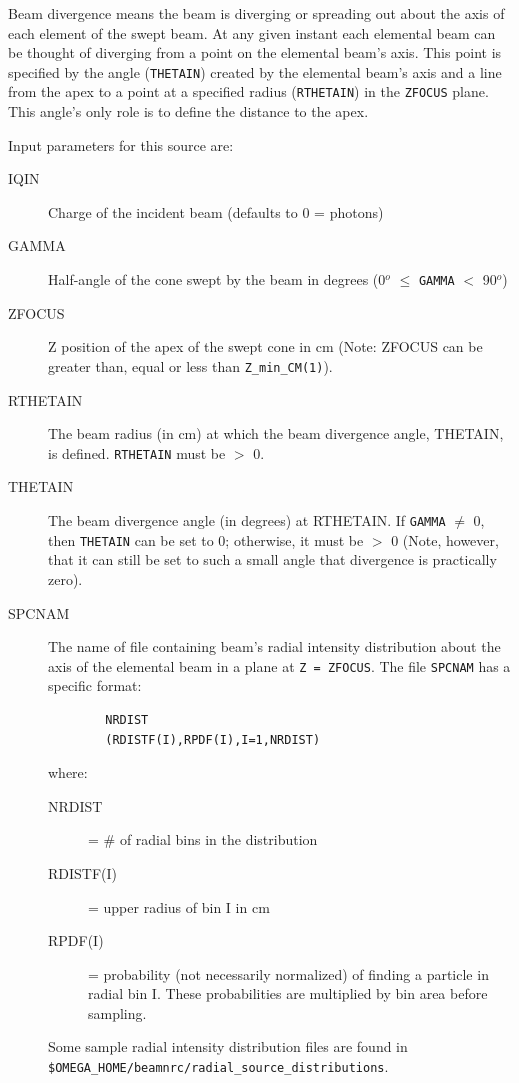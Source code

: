 \documentclass[12pt,twoside]{article}
\begin{document}
Beam divergence means the beam is diverging or
spreading out about the axis of each element of the swept beam. At any
given instant   each
elemental beam can be thought of diverging from a point on the elemental
beam's axis. This point is specified by the angle ({\tt THETAIN})
created by the elemental beam's axis and a line from the apex to a
point at a specified radius ({\tt RTHETAIN}) in the {\tt ZFOCUS} plane.  This
angle's only role is to define the distance to the apex.

Input parameters for this source are:
\vspace{-3mm}
\begin{description}
\item [IQIN] Charge of the incident beam (defaults to 0 = photons)
\item [GAMMA] Half-angle of the cone swept by the beam in degrees (0$^o$ $\leq$
\verb+GAMMA+ $<$ 90$^o$)
\item [ZFOCUS] Z position of the apex of the swept cone in cm (Note: ZFOCUS can
be greater than, equal or less than {\tt Z\_min\_CM(1)}).
\item [RTHETAIN] The beam radius (in cm)
at which the beam divergence angle, THETAIN, is
defined. {\tt RTHETAIN} must be $>$ 0.
\item [THETAIN] The beam divergence angle (in degrees) at RTHETAIN.  If
{\tt GAMMA} $\neq$ 0, then {\tt THETAIN} can be set to 0; otherwise, it
must be $>$ 0 (Note, however, that it can still be set to such a small
angle that divergence is practically zero).
\item [SPCNAM] The name of file containing beam's radial intensity
distribution about the axis of the elemental beam in a plane at {\tt Z =
ZFOCUS}.
The file \verb+SPCNAM+ has a specific format:
\vspace{-5mm}
\begin{verbatim}
        NRDIST
        (RDISTF(I),RPDF(I),I=1,NRDIST)
\end{verbatim}
\vspace{-5mm}
where:
\begin{description}
\item [NRDIST] = \# of radial bins in the distribution
\item [RDISTF(I)] = upper radius of bin I in cm
\item [RPDF(I)] = probability (not necessarily normalized) of finding a
                  particle in radial bin I.  These probabilities are multiplied
                  by bin area before sampling.
\end{description}
Some sample radial intensity distribution files are found in\\
 {\tt \$OMEGA\_HOME/beamnrc/radial\_source\_distributions}.
\end{description}
\end{document}

